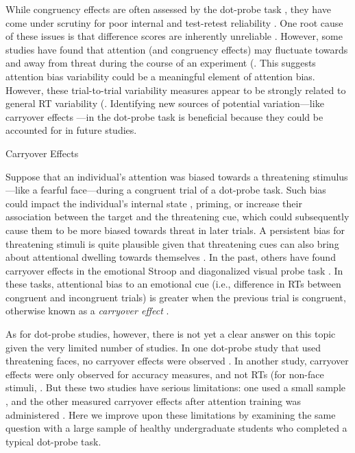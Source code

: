 \documentclass{article}
\begin{document}
	While congruency effects are often assessed by the dot-probe task \autocite{Kruijt2018}\autocite{Mogg2017}, they have come under scrutiny for poor internal and test-retest reliability \autocite{Schmukle2005}\autocite{Staugaard2009}. One root cause of these issues is that difference scores are inherently unreliable \autocite{Hedge2018}. However, some studies have found that attention (and congruency effects) may fluctuate towards and away from threat during the course of an experiment (\autocite{Zvielli2015}. This suggests attention bias variability could be a meaningful element of attention bias. However, these trial-to-trial variability measures appear to be strongly related to general RT variability (\autocite{Carlson2020}\autocite{Kruijt2016}. Identifying new sources of potential variation—like carryover effects —in the dot-probe task is beneficial because they could be accounted for in future studies.



	Carryover Effects



	Suppose that an individual’s attention was biased towards a threatening stimulus—like a fearful face—during a congruent trial of a dot-probe task. Such bias could impact the individual’s internal state \autocite{Panksepp2011}, priming, or increase their association between the target and the threatening cue, which could subsequently cause them to be more biased towards threat in later trials. A persistent bias for threatening stimuli is quite plausible given that threatening cues can also bring about attentional dwelling towards themselves \autocite{Carlson2014}\autocite{Fox2001}. In the past, others have found carryover effects in the emotional Stroop \autocite{Cane2009}\autocite{Clarke2015}\autocite{Waters2005}\autocite{Wilson2007} and diagonalized visual probe task \autocite{Gladwin2019}\autocite{Gladwin2020}\autocite{Gladwin2019a}. In these tasks, attentional bias to an emotional cue (i.e., difference in RTs between congruent and incongruent trials) is greater when the previous trial is congruent, otherwise known as a \emph{carryover effect }\autocite{Gladwin2019}.



	As for dot-probe studies, however, there is not yet a clear answer on this topic given the very limited number of studies. In one dot-probe study that used threatening faces, no carryover effects were observed \autocite{Hill2016}. In another study, carryover effects were only observed for accuracy measures, and not RTs (for non-face stimuli, \autocite{Gladwin2017}. But these two studies have serious limitations: one used a small sample \autocite{Gladwin2017}, and the other measured carryover effects after attention training was administered \autocite{Hill2016}. Here we improve upon these limitations by examining the same question with a large sample of healthy undergraduate students who completed a typical dot-probe task.
\end{document}
